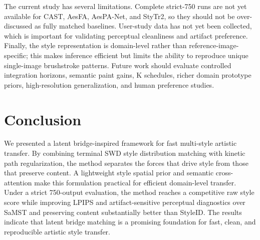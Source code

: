 ﻿\documentclass{article}
\begin{document}
The current study has several limitations. Complete strict-750 runs are not yet available for CAST, AesFA, AesPA-Net, and StyTr2, so they should not be over-discussed as fully matched baselines. User-study data has not yet been collected, which is important for validating perceptual cleanliness and artifact preference. Finally, the style representation is domain-level rather than reference-image-specific; this makes inference efficient but limits the ability to reproduce unique single-image brushstroke patterns. Future work should evaluate controlled integration horizons, semantic paint gains, K schedules, richer domain prototype priors, high-resolution generalization, and human preference studies.

\section{Conclusion}
We presented a latent bridge-inspired framework for fast multi-style artistic transfer. By combining terminal SWD style distribution matching with kinetic path regularization, the method separates the forces that drive style from those that preserve content. A lightweight style spatial prior and semantic cross-attention make this formulation practical for efficient domain-level transfer. Under a strict 750-output evaluation, the method reaches a competitive raw style score while improving LPIPS and artifact-sensitive perceptual diagnostics over SaMST and preserving content substantially better than StyleID. The results indicate that latent bridge matching is a promising foundation for fast, clean, and reproducible artistic style transfer.

\clearpage


\end{document}
